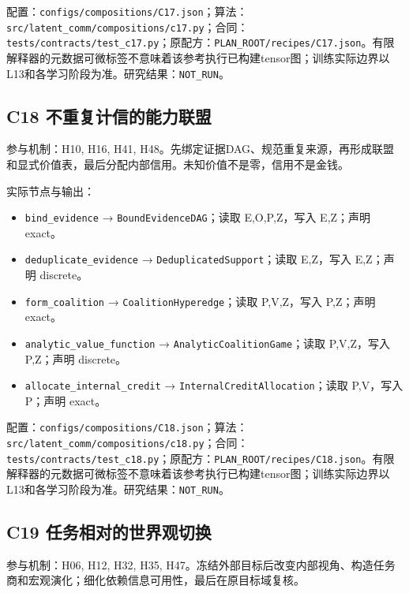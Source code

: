 \documentclass[
  10pt,
]{article}
\begin{document}
配置：{\small\nolinkurl{configs/compositions/C17.json}}；算法：{\small\nolinkurl{src/latent_comm/compositions/c17.py}}；合同：{\small\nolinkurl{tests/contracts/test_c17.py}}；原配方：{\small\nolinkurl{PLAN_ROOT/recipes/C17.json}}。有限解释器的元数据可微标签不意味着该参考执行已构建tensor图；训练实际边界以L13和各学习阶段为准。研究结果：\nolinkurl{NOT_RUN}。

\subsection{C18
不重复计信的能力联盟}\label{c18-ux4e0dux91cdux590dux8ba1ux4fe1ux7684ux80fdux529bux8054ux76df}

参与机制：H10, H16, H41,
H48。先绑定证据DAG、规范重复来源，再形成联盟和显式价值表，最后分配内部信用。未知价值不是零，信用不是金钱。

实际节点与输出：

\begin{itemize}
\item
  \nolinkurl{bind_evidence} → \nolinkurl{BoundEvidenceDAG}；读取
  E,O,P,Z，写入 E,Z；声明 exact。
\item
  \nolinkurl{deduplicate_evidence} →
  \nolinkurl{DeduplicatedSupport}；读取 E,Z，写入 E,Z；声明 discrete。
\item
  \nolinkurl{form_coalition} → \nolinkurl{CoalitionHyperedge}；读取
  P,V,Z，写入 P,Z；声明 exact。
\item
  \nolinkurl{analytic_value_function} →
  \nolinkurl{AnalyticCoalitionGame}；读取 P,V,Z，写入 P,Z；声明
  discrete。
\item
  \nolinkurl{allocate_internal_credit} →
  \nolinkurl{InternalCreditAllocation}；读取 P,V，写入 P；声明 exact。
\end{itemize}

配置：{\small\nolinkurl{configs/compositions/C18.json}}；算法：{\small\nolinkurl{src/latent_comm/compositions/c18.py}}；合同：{\small\nolinkurl{tests/contracts/test_c18.py}}；原配方：{\small\nolinkurl{PLAN_ROOT/recipes/C18.json}}。有限解释器的元数据可微标签不意味着该参考执行已构建tensor图；训练实际边界以L13和各学习阶段为准。研究结果：\nolinkurl{NOT_RUN}。

\subsection{C19
任务相对的世界观切换}\label{c19-ux4efbux52a1ux76f8ux5bf9ux7684ux4e16ux754cux89c2ux5207ux6362}

参与机制：H06, H12, H32, H35,
H47。冻结外部目标后改变内部视角、构造任务商和宏观演化；细化依赖信息可用性，最后在原目标域复核。
\end{document}

